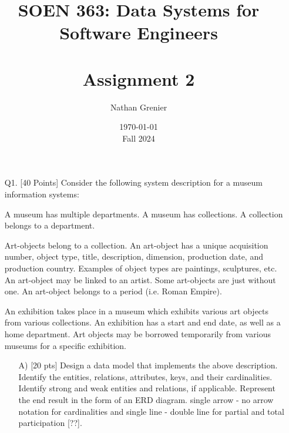 \documentclass[12pt]{article}
\title{SOEN 363: Data Systems for Software Engineers\\
\ \\
Assignment 2}
\author{Nathan Grenier}
\date{\today \\ Fall 2024}
\begin{document}
\begin{spacing}{1.5}
      \maketitle

      \newpage

      \begin{enumerate}

            \item[Q1.] [40 Points] Consider the following system description for a museum information systems:

                  A museum has multiple departments. A museum has collections. A collection belongs to a department.

                  Art-objects belong to a collection. An art-object has a unique acquisition number, object type, title, description, dimension, production date, and production
                  country. Examples of object types are paintings, sculptures, etc. An art-object may be linked to an artist. Some art-objects are just without one. An art-object belongs to a period (i.e. Roman Empire).

                  An exhibition takes place in a museum which exhibits various art objects from various collections. An exhibition has a start and end date, as well as a home department. Art objects may be borrowed temporarily from various museums for a specific exhibition.

                  \begin{enumerate}

                        \item[A)] [20 pts] Design a data model that implements the above description. Identify the entities, relations, attributes, keys, and their cardinalities. Identify strong and weak entities and relations, if applicable. Represent the end result in the form of an ERD diagram. single arrow - no arrow notation for cardinalities and single line - double line for partial and total participation [??].


                              \newpage


\end{enumerate}
\end{enumerate}
\end{spacing}
\end{document}

